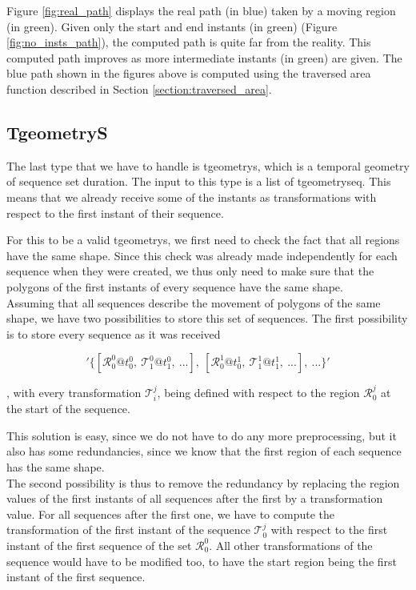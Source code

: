 Figure \ref{fig:real_path} displays the real path (in blue) taken by a moving region (in green). Given only the start and end instants (in green) (Figure \ref{fig:no_insts_path}), the computed path is quite far from the reality. This computed path improves as more intermediate instants (in green) are given. The blue path shown in the figures above is computed using the traversed area function described in Section \ref{section:traversed_area}.

\subsection{TgeometryS}
\label{section:internal_repr_s}

The last type that we have to handle is tgeometrys, which is a temporal geometry of sequence set duration. The input to this type is a list of tgeometryseq. This means that we already receive some of the instants as transformations with respect to the first instant of their sequence.

For this to be a valid tgeometrys, we first need to check the fact that all regions have the same shape. Since this check was already made independently for each sequence when they were created, we thus only need to make sure that the polygons of the first instants of every sequence have the same shape. \\

Assuming that all sequences describe the movement of  polygons of the same shape, we have two possibilities to store this set of sequences. The first possibility is to store every sequence as it was received

\[
    '\{[\mathcal{R}_0^0@t_0^0,\ \mathcal{T}_1^0@t_1^0,\ ...],\ [\mathcal{R}_0^1@t_0^1,\ \mathcal{T}_1^1@t_1^1,\ ...],\ ...\}'
\]

, with every transformation $\mathcal{T}_i^j$, being defined with respect to the region $\mathcal{R}_0^j$ at the start of the sequence.

This solution is easy, since we do not have to do any more preprocessing, but it also has some redundancies, since we know that the first region of each sequence has the same shape. \\

The second possibility is thus to remove the redundancy by replacing the region values of the first instants of all sequences after the first by a transformation value. For all sequences after the first one, we have to compute the transformation of the first instant of the sequence $\mathcal{T}_0^j$ with respect to the first instant of the first sequence of the set $\mathcal{R}_0^0$. All other transformations of the sequence would have to be modified too, to have the start region being the first instant of the first sequence.

